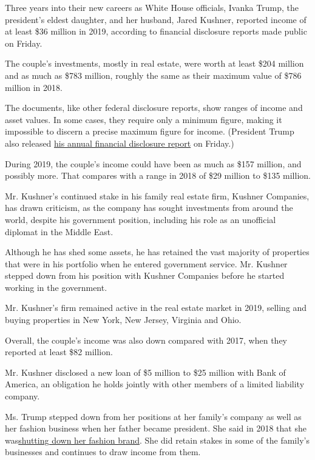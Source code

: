 Three years into their new careers as White House officials, Ivanka
Trump, the president's eldest daughter, and her husband, Jared Kushner,
reported income of at least \$36 million in 2019, according to financial
disclosure reports made public on Friday.

The couple's investments, mostly in real estate, were worth at least
\$204 million and as much as \$783 million, roughly the same as their
maximum value of \$786 million in 2018.

The documents, like other federal disclosure reports, show ranges of
income and asset values. In some cases, they require only a minimum
figure, making it impossible to discern a precise maximum figure for
income. (President Trump also released
\href{https://www.nytimes.com/2020/07/31/business/trump-financial-disclosure.html}{his
annual financial disclosure report} on Friday.)

During 2019, the couple's income could have been as much as \$157
million, and possibly more. That compares with a range in 2018 of \$29
million to \$135 million.

Mr. Kushner's continued stake in his family real estate firm, Kushner
Companies, has drawn criticism, as the company has sought investments
from around the world, despite his government position, including his
role as an unofficial diplomat in the Middle East.

Although he has shed some assets, he has retained the vast majority of
properties that were in his portfolio when he entered government
service. Mr. Kushner stepped down from his position with Kushner
Companies before he started working in the government.

Mr. Kushner's firm remained active in the real estate market in 2019,
selling and buying properties in New York, New Jersey, Virginia and
Ohio.

Overall, the couple's income was also down compared with 2017, when they
reported at least \$82 million.

Mr. Kushner disclosed a new loan of \$5 million to \$25 million with
Bank of America, an obligation he holds jointly with other members of a
limited liability company.

Ms. Trump stepped down from her positions at her family's company as
well as her fashion business when her father became president. She said
in 2018 that she
was\href{https://www.nytimes.com/2018/07/24/business/ivanka-trump-brand-clothing.html}{shutting
down her fashion brand}. She did retain stakes in some of the family's
businesses and continues to draw income from them.

